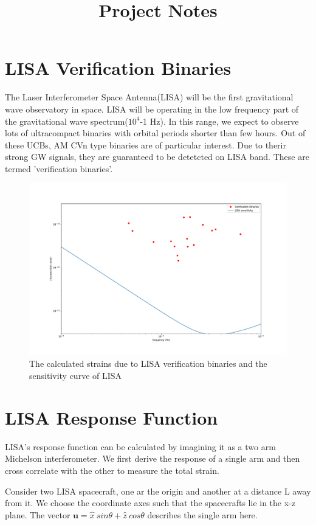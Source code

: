 \documentclass[10pt,a4paper]{article}
\title{Project Notes}
\begin{document}
\maketitle

\section*{LISA Verification Binaries}
The Laser Interferometer Space Antenna(LISA) will be the first gravitational wave observatory in space. LISA will be operating in the low frequency part of the gravitational wave spectrum($10^4$-1 Hz). In this range, we expect to observe lots of ultracompact binaries with orbital periods shorter than few hours. Out of these UCBs, AM CVn type binaries are of particular interest. Due to therir strong GW signals, they are guaranteed to be  detetcted on LISA band. These are termed 'verification binaries'.

\begin{figure}[ht]
\centering
\includegraphics[scale=0.25]{../Figures/strain_verific_binary.pdf}
\caption{The calculated strains due to LISA verification binaries and the sensitivity curve of LISA}
\end{figure}
\section*{LISA Response Function}

LISA's response function can be calculated by imagining it as a two arm Michelson interferometer. We first derive the response of a single arm and then cross correlate with the other to measure the total strain.

Consider two LISA spacecraft, one ar the origin and another at a distance L away from it.  We choose the coordinate axes such that the spacecrafts lie in the x-z plane. The vector  $ \textbf{u} = \hat{x} \ sin \theta + \hat{z} \ cos \theta$ describes the single arm here.
\end{document}
